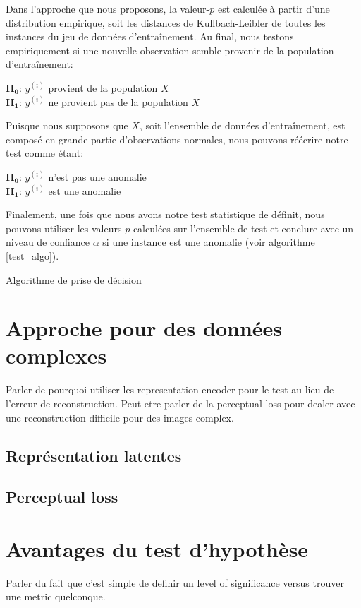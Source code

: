 Dans l'approche que nous proposons, la valeur-$p$ est calculée à partir d'une distribution empirique, soit les distances de Kullbach-Leibler de toutes les instances du jeu de données d'entraînement. Au final, nous testons empiriquement si une nouvelle observation semble provenir de la population d'entraînement:

\begin{center}
	$\boldsymbol{H_0}$: $y^{(i)}$ provient de la population $X$ \\
	$\boldsymbol{H_1}$: $y^{(i)}$ ne provient pas de la population $X$
\end{center}

\noindent Puisque nous supposons que $X$, soit l'ensemble de données d'entraînement, est composé en grande partie d'observations normales, nous pouvons réécrire notre test comme étant:

\begin{center}
	$\boldsymbol{H_0}$: $y^{(i)}$ n'est pas une anomalie \\
	$\boldsymbol{H_1}$: $y^{(i)}$ est une anomalie
\end{center}

Finalement, une fois que nous avons notre test statistique de définit, nous pouvons utiliser les valeurs-$p$ calculées sur l'ensemble de test et conclure avec un niveau de confiance $\alpha$ si une instance est une anomalie (voir algorithme \ref{test_algo}).

\begin{center}
	\begin{algorithm}[H] \label{test_algo}
		\SetAlgoLined
		\caption{Algorithme de prise de décision}
	\end{algorithm}
\end{center}

\section{Approche pour des données complexes}

Parler de pourquoi utiliser les representation encoder pour le test au lieu de l'erreur de reconstruction. Peut-etre parler de la perceptual loss pour dealer avec une reconstruction difficile pour des images complex.

\subsection{Représentation latentes}

\subsection{Perceptual loss}

\section{Avantages du test d'hypothèse}

Parler du fait que c'est simple de definir un level of significance versus trouver une metric quelconque.